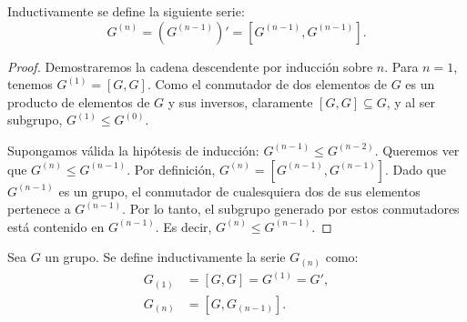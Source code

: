 Inductivamente se define la siguiente serie:
\begin{equation*}
    G^{(n)} = (G^{(n-1)})' = [G^{(n-1)}, G^{(n-1)}].
\end{equation*}


\begin{proof}
    Demostraremos la cadena descendente por inducción sobre $n$.
    Para $n=1$, tenemos $G^{(1)} = [G, G]$. Como el conmutador de dos elementos de $G$ es un producto de elementos de $G$ y sus inversos, claramente $[G, G] \subseteq G$, y al ser subgrupo, $G^{(1)} \le G^{(0)}$.
    
    Supongamos válida la hipótesis de inducción: $G^{(n-1)} \le G^{(n-2)}$.
    Queremos ver que $G^{(n)} \le G^{(n-1)}$.
    Por definición, $G^{(n)} = [G^{(n-1)}, G^{(n-1)}]$.
    Dado que $G^{(n-1)}$ es un grupo, el conmutador de cualesquiera dos de sus elementos pertenece a $G^{(n-1)}$. Por lo tanto, el subgrupo generado por estos conmutadores está contenido en $G^{(n-1)}$.
    Es decir, $G^{(n)} \le G^{(n-1)}$.
\end{proof}

\begin{defi}
    Sea $G$ un grupo. Se define inductivamente la serie $G_{(n)}$ como:
    \begin{align*}
        G_{(1)} &= [G, G] = G^{(1)} = G', \\
        G_{(n)} &= [G, G_{(n-1)}].
    \end{align*}
\end{defi}


